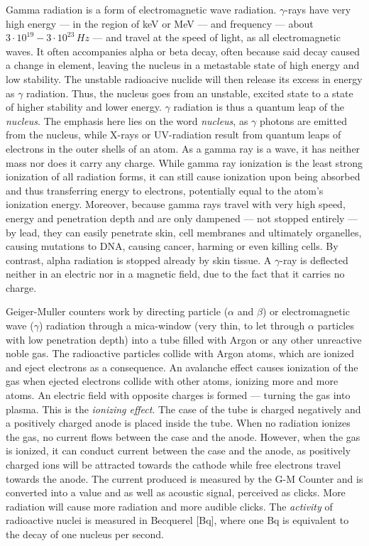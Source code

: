 Gamma radiation is a form of electromagnetic wave radiation. $\gamma$-rays have very high energy --- in the region of keV or MeV --- and frequency --- about $3 \cdot 10^{19} - 3 \cdot 10^{23}\, Hz$ --- and travel at the speed of light, as all electromagnetic waves. It often accompanies alpha or beta decay, often because said decay caused a change in element, leaving the nucleus in a metastable state of high energy and low stability. The unstable radioacive nuclide will then release its excess in energy as $\gamma$ radiation. Thus, the nucleus goes from an unstable, excited state to a state of higher stability and lower energy. $\gamma$ radiation is thus a quantum leap of the \emph{nucleus}. The emphasis here lies on the word \emph{nucleus}, as $\gamma$ photons are emitted from the nucleus, while X-rays or UV-radiation result from quantum leaps of electrons in the outer shells of an atom. As a gamma ray is a wave, it has neither mass nor does it carry any charge. While gamma ray ionization is the least strong ionization of all radiation forms, it can still cause ionization upon being absorbed and thus transferring energy to electrons, potentially equal to the atom's ionization energy. Moreover, because gamma rays travel with very high speed, energy and penetration depth and are only dampened --- not stopped entirely --- by lead, they can easily penetrate skin, cell membranes and ultimately organelles, causing mutations to DNA, causing cancer, harming or even killing cells. By contrast, alpha radiation is stopped already by skin tissue. A $\gamma$-ray is deflected neither in an electric nor in a magnetic field, due to the fact that it carries no charge.


Geiger-Muller counters work by directing particle ($\alpha$ and $\beta$) or electromagnetic wave ($\gamma$) radiation through a mica-window (very thin, to let through $\alpha$ particles with low penetration depth) into a tube filled with Argon or any other unreactive noble gas. The radioactive particles collide with Argon atoms, which are ionized and eject electrons as a consequence. An avalanche effect causes ionization of the gas when ejected electrons collide with other atoms, ionizing more and more atoms. An electric field with opposite charges is formed --- turning the gas into plasma. This is the \emph{ionizing effect}. The case of the tube is charged negatively and a positively charged anode is placed inside the tube. When no radiation ionizes the gas, no current flows between the case and the anode. However, when the gas is ionized, it can conduct current between the case and the anode, as positively charged ions will be attracted towards the cathode while free electrons travel towards the anode. The current produced is measured by the G-M Counter and is converted into a value and as well as acoustic signal, perceived as clicks. More radiation will cause more radiation and more audible clicks. The \emph{activity} of radioactive nuclei is measured in Becquerel [Bq], where one Bq is equivalent to the decay of one nucleus per second.

